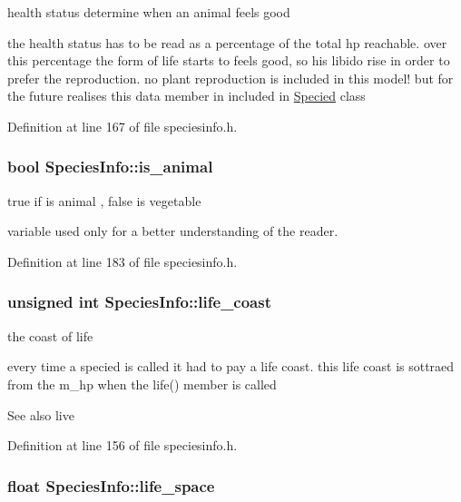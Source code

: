 health status determine when an animal feels good 

the health status has to be read as a percentage of the total hp reachable. over this percentage the form of life starts to feels good, so his libido rise in order to prefer the reproduction. no plant reproduction is included in this model! but for the future realises this data member in included in \hyperlink{classSpecied}{Specied} class 

Definition at line 167 of file speciesinfo.h.

\hypertarget{structSpeciesInfo_a25738d8f07439886c95c5501c3b07259}{
\subsubsection[{is\_\-animal}]{\setlength{\rightskip}{0pt plus 5cm}bool {\bf SpeciesInfo::is\_\-animal}}}
\label{structSpeciesInfo_a25738d8f07439886c95c5501c3b07259}


true if is animal , false is vegetable 

variable used only for a better understanding of the reader. 

Definition at line 183 of file speciesinfo.h.

\hypertarget{structSpeciesInfo_a5582008c964055461a2cf00d4d727196}{
\subsubsection[{life\_\-coast}]{\setlength{\rightskip}{0pt plus 5cm}unsigned int {\bf SpeciesInfo::life\_\-coast}}}
\label{structSpeciesInfo_a5582008c964055461a2cf00d4d727196}


the coast of life 

every time a specied is called it had to pay a life coast. this life coast is sottraed from the m\_\-hp when the life() member is called \begin{DoxySeeAlso}{See also}
live 
\end{DoxySeeAlso}


Definition at line 156 of file speciesinfo.h.

\hypertarget{structSpeciesInfo_afec7fed12e22abfef5032407e9042d98}{
\subsubsection[{life\_\-space}]{\setlength{\rightskip}{0pt plus 5cm}float {\bf SpeciesInfo::life\_\-space}}}
\label{structSpeciesInfo_afec7fed12e22abfef5032407e9042d98}


